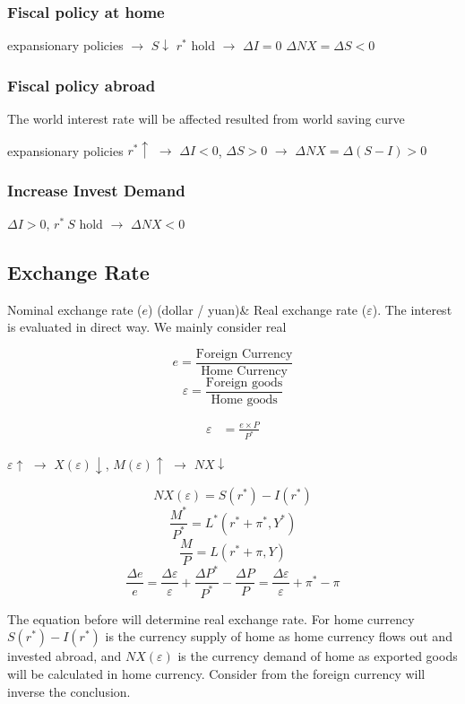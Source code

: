 \documentclass[10pt, a4paper]{article}
\begin{document}
        \subsubsection{Fiscal policy at home}
            expansionary policies $\rightarrow$ $S\downarrow$ $r^*$ hold $\rightarrow$ $\Delta I = 0$ $\Delta NX = \Delta S < 0$
        \subsubsection{Fiscal policy abroad}
            The world interest rate will be affected resulted from world saving curve 

            expansionary policies $r^*\uparrow$ $\rightarrow$ $\Delta I < 0$, $\Delta S > 0$ $\rightarrow$ $\Delta NX = \Delta(S - I) > 0$
        \subsubsection{Increase Invest Demand} 
            $\Delta I > 0$, $r^*\ S$ hold $\rightarrow$ $\Delta NX < 0$

    \subsection{Exchange Rate}
        Nominal exchange rate ($e$) (dollar / yuan)\& Real exchange rate ($\varepsilon$). The interest is evaluated in direct way. We mainly consider real 

        $$e = \frac{\text{Foreign Currency}}{\text{Home Currency}}$$
        $$\varepsilon = \frac{\text{Foreign goods}}{\text{Home goods}}$$

        \begin{align*}
            \varepsilon &= \frac{e \times P}{P ^ *} 
        \end{align*}

        \begin{center}
        $\varepsilon \uparrow$ $\rightarrow$ $X(\varepsilon) \downarrow$, $M(\varepsilon) \uparrow$ $\rightarrow$ $NX \downarrow$
        \end{center}
   
        $$NX(\varepsilon) = S(r^*) - I(r^*)$$
        $$\frac{M^*}{P^*} = L^*(r^* + \pi^*, Y^*)$$
        $$\frac{M}{P} = L(r ^ * + \pi, Y)$$
        $$\frac{\Delta e}{e} = \frac{\Delta \varepsilon}{\varepsilon} + \frac{\Delta P^*}{P^*} - \frac{\Delta P}{P} = \frac{\Delta \varepsilon}{\varepsilon} + \pi^* - \pi$$

        The equation before will determine real exchange rate. For home currency $S(r^*) - I(r^*)$ is the currency supply of home as home currency flows out and invested abroad, and $NX(\varepsilon)$ is the currency demand of home as exported goods will be calculated in home currency. Consider from the foreign currency will inverse the conclusion.  
\end{document}
